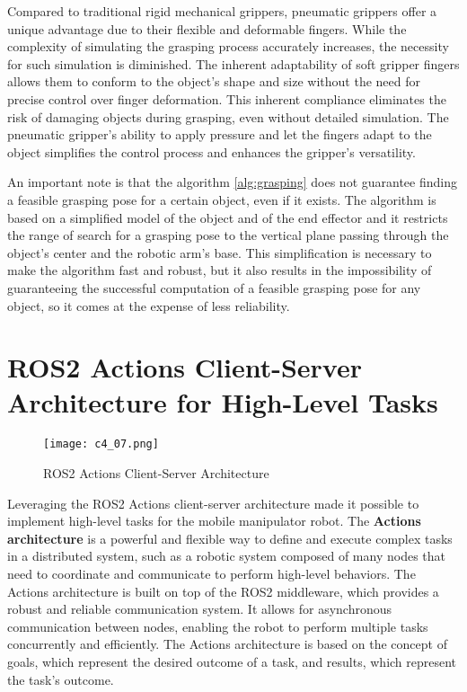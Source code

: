 Compared to traditional rigid mechanical grippers, pneumatic grippers offer a unique advantage due to their 
flexible and deformable fingers. While the complexity of simulating the grasping process accurately increases,
the necessity for such simulation is diminished. The inherent adaptability of soft gripper fingers allows them 
to conform to the object's shape and size without the need for precise control over finger deformation.
This inherent compliance eliminates the risk of damaging objects during grasping, even without detailed simulation.
The pneumatic gripper's ability to apply pressure and let the fingers adapt to the object simplifies 
the control process and enhances the gripper's versatility.

An important note is that the algorithm \ref{alg:grasping} does not guarantee finding a feasible grasping
pose for a certain object, even if it exists. 
The algorithm is based on a simplified model of the object and of the end effector and it
restricts the range of search for a grasping pose to the vertical plane passing through the object's center
and the robotic arm's base. This simplification is necessary to make the algorithm fast and robust, but it
also results in the impossibility of guaranteeing the successful computation of a feasible grasping pose
for any object, so it comes at the expense of less reliability.

\section{ROS2 Actions Client-Server Architecture for High-Level Tasks}

\begin{figure}[t]
    \centering
    \texttt{[image: c4\_07.png]}
    \caption{ROS2 Actions Client-Server Architecture}
    \label{fig:actions_architecture}
\end{figure}

Leveraging the ROS2 Actions client-server architecture made it possible to implement high-level tasks for the mobile manipulator
robot. The \textbf{Actions architecture} is a powerful and flexible way to define and execute complex tasks
in a distributed system, such as a robotic system composed of many nodes that need to coordinate and communicate
to perform high-level behaviors. The Actions architecture is built on top of the ROS2 middleware, which provides
a robust and reliable communication system. It allows for asynchronous communication between nodes,
enabling the robot to perform multiple tasks concurrently and efficiently. The Actions architecture is based on
the concept of goals, which represent the desired outcome of a task, and results, which represent the task's outcome.

